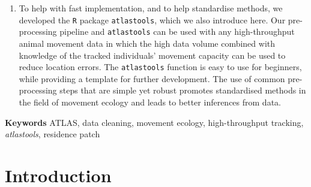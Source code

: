 \documentclass[10pt,paper=a4,headings=standardclasses
]{scrartcl}
\begin{document}
\begin{enumerate}
    \item To help with fast implementation, and to help standardise methods, we developed the \texttt{R} package \texttt{atlastools}, which we also introduce here.
    Our pre-processing pipeline and \texttt{atlastools} can be used with any high-throughput animal movement data in which the high data volume combined with knowledge of the tracked individuals’ movement capacity can be used to reduce location errors.
    The \texttt{atlastools} function is easy to use for beginners, while providing a template for further development.
    The use of common pre-processing steps that are simple yet robust promotes standardised methods in the field of movement ecology and leads to better inferences from data.
\end{enumerate}

\textbf{Keywords} ATLAS, data cleaning, movement ecology, high-throughput tracking, \textit{atlastools}, residence patch

\linenumbers

\section{Introduction}
\end{document}
